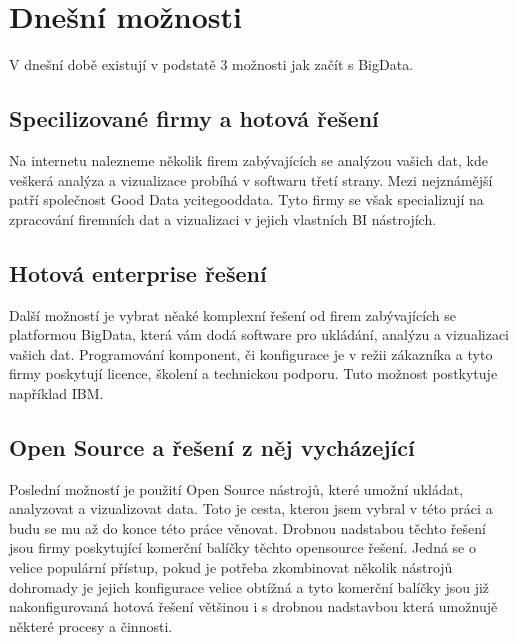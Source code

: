 \section{Dnešní možnosti}
V dnešní době existují v podstatě 3 možnosti jak začít s BigData. 

\subsection{Specilizované firmy a hotová řešení}
Na internetu nalezneme několik firem zabývajících se analýzou vašich dat, kde veškerá analýza a vizualizace probíhá v softwaru třetí strany. Mezi nejznámější patří společnost Good Data ycite{gooddata}. Tyto firmy se však specializují na zpracování firemních dat a vizualizaci v jejich vlastních BI nástrojích.

\subsection{Hotová enterprise řešení}
Další možností je vybrat něaké komplexní řešení od firem zabývajících se platformou BigData, která vám dodá software pro ukládání, analýzu a vizualizaci vašich dat. Programování komponent, či konfigurace je v režii zákazníka a tyto firmy poskytují licence, školení a technickou podporu. Tuto možnost postkytuje například IBM.

\subsection{Open Source a řešení z něj vycházející} 
Poslední možností je použití Open Source nástrojů, které umožní ukládat, analyzovat a vizualizovat data. Toto je cesta, kterou jsem vybral v této práci a budu se mu až do konce této práce věnovat. Drobnou nadstabou těchto řešení jsou firmy poskytující komerční balíčky těchto opensource řešení. Jedná se o velice populární přístup, pokud je potřeba zkombinovat několik nástrojů dohromady je jejich konfigurace velice obtížná a tyto komerční balíčky jsou již nakonfigurovaná hotová řešení většinou i s drobnou nadstavbou která umožnujě některé procesy a činnosti. 
